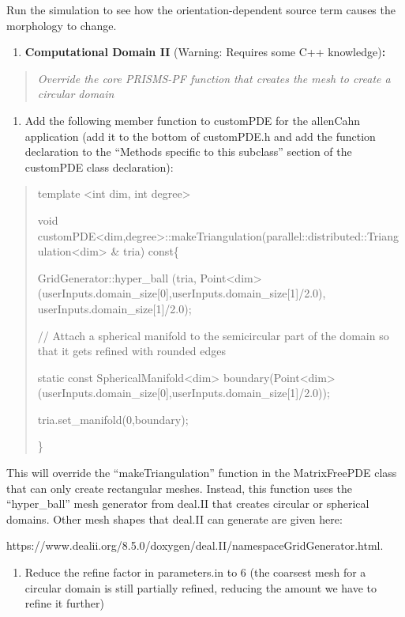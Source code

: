 \documentclass[]{article}
\begin{document}
Run the simulation to see how the orientation-dependent source term
causes the morphology to change.

\begin{enumerate}
\def\labelenumi{\arabic{enumi}.}
\item
  \textbf{Computational Domain II} (Warning: Requires some C++
  knowledge)\textbf{:}
\end{enumerate}

\begin{quote}
\emph{Override the core PRISMS-PF function that creates the mesh to
create a circular domain}
\end{quote}

\begin{enumerate}
\def\labelenumi{\alph{enumi}.}
\item
  Add the following member function to customPDE for the allenCahn
  application (add it to the bottom of customPDE.h and add the function
  declaration to the ``Methods specific to this subclass'' section of
  the customPDE class declaration):
\end{enumerate}

\begin{quote}
template \textless{}int dim, int degree\textgreater{}

void
customPDE\textless{}dim,degree\textgreater{}::makeTriangulation(parallel::distributed::Triangulation\textless{}dim\textgreater{}
\& tria) const\{

GridGenerator::hyper\_ball (tria,
Point\textless{}dim\textgreater{}(userInputs.domain\_size{[}0{]},userInputs.domain\_size{[}1{]}/2.0),
userInputs.domain\_size{[}1{]}/2.0);

// Attach a spherical manifold to the semicircular part of the domain so
that it gets refined with rounded edges

static const SphericalManifold\textless{}dim\textgreater{}
boundary(Point\textless{}dim\textgreater{}(userInputs.domain\_size{[}0{]},userInputs.domain\_size{[}1{]}/2.0));

tria.set\_manifold(0,boundary);

\}
\end{quote}

This will override the ``makeTriangulation'' function in the
MatrixFreePDE class that can only create rectangular meshes. Instead,
this function uses the ``hyper\_ball'' mesh generator from deal.II that
creates circular or spherical domains. Other mesh shapes that deal.II
can generate are given here:

https://www.dealii.org/8.5.0/doxygen/deal.II/namespaceGridGenerator.html.

\begin{enumerate}
\def\labelenumi{\alph{enumi}.}
\item
  Reduce the refine factor in parameters.in to 6 (the coarsest mesh for
  a circular domain is still partially refined, reducing the amount we
  have to refine it further)
\end{enumerate}
\end{document}
